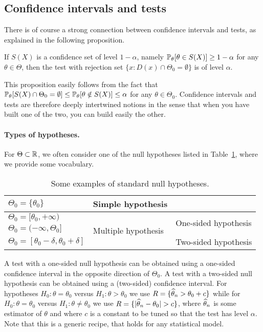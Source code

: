 \subsection{Confidence intervals and tests} %


There is of course a strong connection between confidence intervals and tests, as explained in the following proposition.
\begin{proposition}
	\label{prop:ci-and-tests}
	If $S(X)$ is a confidence set of level $1 - \alpha$, namely $\P_\theta[ \theta \in S(X)] \geq 1 - \alpha$ for any $\theta \in \Theta$, then the test with rejection set $\{ x : D(x) \cap \Theta_0  = \emptyset\}$ is of level $\alpha$.
\end{proposition}
This proposition easily follows from the fact that $\P_\theta[ S(X) \cap \Theta_0 = \emptyset] \leq \P_\theta[ \theta \notin S(X) ] \leq \alpha$ for any $\theta \in \Theta_0$.
Confidence intervals and tests are therefore deeply intertwined notions in the sense that when you have built one of the two, you can build easily the other.

\paragraph{Types of hypotheses.} %

For $\Theta \subset \R$, we often consider one of the null hypotheses listed in Table~\ref{tab:standard-null-hypothesis}, where we provide some vocabulary.
\begin{table}[htbp]
	\centering
	\small
	\begin{tabular}{|l|l|l|}\hline
		$\Theta_0 = \{ \theta_0 \}$ & Simple hypothesis & \\ \hline
		$\Theta_0 = [\theta_0, +\infty)$ & \multirow{3}{*}{Multiple hypothesis} & \multirow{2}{*}{One-sided hypothesis} \\
		$\Theta_0 = (-\infty, \Theta_0]$ & & \\  \cline{3-3}
		$\Theta_0 = [\theta_0 - \delta, \theta_0 + \delta]$ & & Two-sided hypothesis \\ \hline
	\end{tabular}
	\caption{Some examples of standard null hypotheses.}
	\label{tab:standard-null-hypothesis}
\end{table}

A test with a one-sided null hypothesis can be obtained using a one-sided confidence interval in the opposite direction of $\Theta_0$. A test with a two-sided null hypothesis can be obtained using a (two-sided) confidence interval.
For hypotheses $H_0 : \theta = \theta_0$ versus $H_1 : \theta > \theta_0$ we use $R = \{ \wh \theta_n > \theta_0 + c \}$ while for $H_0 : \theta = \theta_0$ versus $H_1 : \theta \neq \theta_0$ we use $R = \{ | \wh \theta_n - \theta_0 | > c \}$, where $\wh \theta_n$ is some estimator of $\theta$ and where $c$ is a constant to be tuned so that the test has level $\alpha$.
Note that this is a generic recipe, that holds for any statistical model.

